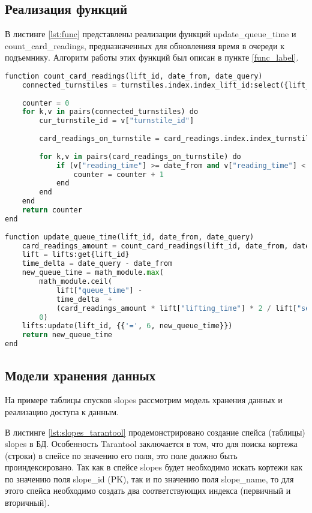 \subsection{Реализация функций}

В листинге \ref{lst:func} представлены реализации функций update\_queue\_time и count\_card\_readings, предназначенных для обновленияя время в очереди к подъемнику. Алгоритм работы этих функций был описан в пункте \ref{func_label}.

\captionsetup{justification=centering,singlelinecheck=off}
\begin{lstlisting}[label=lst:func, caption=Функции update\_queue\_time и count\_card\_readings, language=python]
function count_card_readings(lift_id, date_from, date_query)
	connected_turnstiles = turnstiles.index.index_lift_id:select({lift_id})
	
	counter = 0
	for k,v in pairs(connected_turnstiles) do
		cur_turnstile_id = v["turnstile_id"]
		
		card_readings_on_turnstile = card_readings.index.index_turnstile:select({cur_turnstile_id})
		
		for k,v in pairs(card_readings_on_turnstile) do
			if (v["reading_time"] >= date_from and v["reading_time"] < date_query) then
				counter = counter + 1
			end
		end
	end
	return counter
end
 
function update_queue_time(lift_id, date_from, date_query)
	card_readings_amount = count_card_readings(lift_id, date_from, date_query)
	lift = lifts:get{lift_id}
	time_delta = date_query - date_from
	new_queue_time = math_module.max(
		math_module.ceil(
			lift["queue_time"] - 
			time_delta  + 
			(card_readings_amount * lift["lifting_time"] * 2 / lift["seats_amount"])), 
		0)
	lifts:update(lift_id, {{'=', 6, new_queue_time}})
	return new_queue_time
end
\end{lstlisting}

\subsection{Модели хранения данных}

На примере таблицы спусков slopes рассмотрим модель хранения данных и реализацию доступа к данным.

В листинге \ref{lst:slopes_tarantool} продемонстрировано создание спейса (таблицы) slopes в БД. Особенность Tarantool заключается в том, что для поиска кортежа (строки) в спейсе по значению его поля, это поле должно быть проиндексировано. Так как в спейсе slopes будет необходимо искать кортежи как по значению поля slope\_id (PK), так и по значению поля slope\_name, то для этого спейса необходимо создать два соответствующих индекса (первичный и вторичный).

